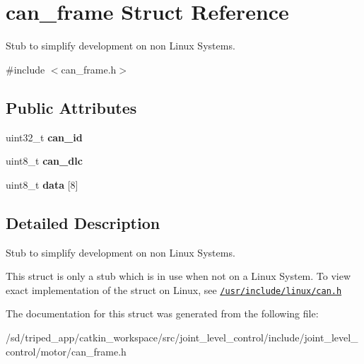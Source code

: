 \hypertarget{structcan__frame}{}\section{can\+\_\+frame Struct Reference}
\label{structcan__frame}


Stub to simplify development on non Linux Systems.  




{\ttfamily \#include $<$can\+\_\+frame.\+h$>$}

\subsection*{Public Attributes}
\begin{DoxyCompactItemize}
\item 
\mbox{\label{structcan__frame_a43e67e10ddf61e65638262e3e782154b}} 
uint32\+\_\+t {\bfseries can\+\_\+id}
\item 
\mbox{\label{structcan__frame_aa055f09fd81b299201618396b7dc9314}} 
uint8\+\_\+t {\bfseries can\+\_\+dlc}
\item 
\mbox{\label{structcan__frame_ade6eedeba6cc24ef2f7a2aa2ed452291}} 
uint8\+\_\+t {\bfseries data} \mbox{[}8\mbox{]}
\end{DoxyCompactItemize}


\subsection{Detailed Description}
Stub to simplify development on non Linux Systems. 

This struct is only a stub which is in use when not on a Linux System. To view exact implementation of the struct on Linux, see \href{/usr/include/linux/can.h}{\tt /usr/include/linux/can.h} 

The documentation for this struct was generated from the following file\+:\begin{DoxyCompactItemize}
\item 
/sd/triped\+\_\+app/catkin\+\_\+workspace/src/joint\+\_\+level\+\_\+control/include/joint\+\_\+level\+\_\+control/motor/can\+\_\+frame.\+h\end{DoxyCompactItemize}
